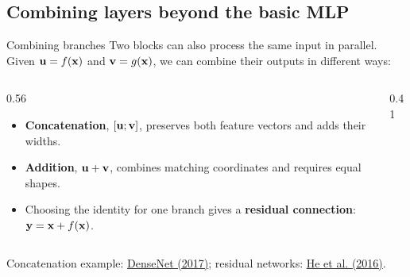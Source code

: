 \documentclass[12pt,aspectratio=169]{beamer}
\begin{document}
\subsection{Combining layers beyond the basic MLP}



\begin{frame}{Combining branches}
	\small
	\setlength{\parskip}{3pt}
	\setlength{\abovedisplayskip}{5pt}
	\setlength{\belowdisplayskip}{5pt}
	Two blocks can also process the same input in parallel. Given
	$\boldsymbol{\mathbf{u}}=f(\boldsymbol{\mathbf{x}})$ and $\boldsymbol{\mathbf{v}}=g(\boldsymbol{\mathbf{x}})$, we can combine their outputs in different ways:

	\begin{columns}[c,onlytextwidth]
		\begin{column}{0.56\textwidth}
			\begin{itemize}
				\setlength{\itemsep}{3pt}
				\item \textbf{Concatenation}, $[\boldsymbol{\mathbf{u}};\boldsymbol{\mathbf{v}}]$, preserves both
				      feature vectors and adds their widths.
				\item \textbf{Addition}, $\boldsymbol{\mathbf{u}}+\boldsymbol{\mathbf{v}}$, combines matching
				      coordinates and requires equal shapes.
				\item Choosing the identity for one branch gives a
				      \textbf{residual connection}: $\boldsymbol{\mathbf{y}}=\boldsymbol{\mathbf{x}}+f(\boldsymbol{\mathbf{x}})$.
			\end{itemize}
		\end{column}
		\begin{column}{0.41\textwidth}
			\centering
			
		\end{column}
	\end{columns}
	\vfill
	{\tiny\color{drawgray}
		Concatenation example: \href{https://arxiv.org/abs/1608.06993}{DenseNet (2017)};
		residual networks: \href{https://arxiv.org/abs/1512.03385}{He et al. (2016)}.\par}
\end{frame}
\end{document}
